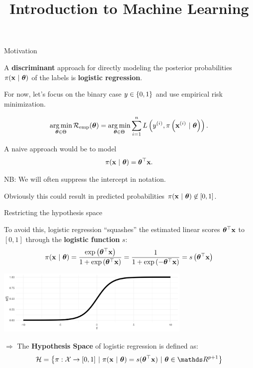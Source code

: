 \documentclass[11pt,compress,t,notes=noshow, xcolor=table]{beamer}
\title{Introduction to Machine Learning}
\begin{document}

\framebreak


\begin{vbframe}{Motivation}

A \textbf{discriminant} approach for directly modeling the posterior probabilities $\pi(\mathbf{x}~|~ \bm{\theta})$ of the labels is \textbf{logistic regression}. 

For now, let's focus on the binary case $y \in \{0, 1\}$ and use empirical risk minimization.
  
$$ \operatorname*{arg\,min}_{\bm{\theta} \in \Theta} \mathcal{R}_{\text{emp}}(\bm{\theta}) = \operatorname*{arg\,min}_{\bm{\theta} \in \Theta} \sum\limits_{i=1}^n L\left(y^{(i)}, \pi\left(\mathbf{x}^{(i)} ~|~ \bm{\theta}\right)\right).$$

\lz
A naive approach would be to model
\[
\pi(\mathbf{x}~|~ \bm{\theta}) = \bm{\theta}^\top \mathbf{x} .
\]

NB: We will often suppress the intercept in notation.

\lz

Obviously this could result in predicted probabilities $\pi(\mathbf{x}~|~ \bm{\theta}) \not\in [0,1]$.

\end{vbframe}

\begin{vbframe}{Restricting the hypothesis space}

To avoid this, logistic regression \enquote{squashes} the estimated linear scores $\bm{\theta}^\top \mathbf{x}$ to $[0,1]$ through the \textbf{logistic function} $s$:
\[
\pi(\mathbf{x}~|~ \bm{\theta}) = \frac{\exp\left( \bm{\theta}^\top \mathbf{x} \right)}{1+\exp\left(\bm{\theta}^\top \mathbf{x} \right)} = \frac{1}{1+\exp\left( -\bm{\theta}^\top \mathbf{x} \right)} = s\left( \bm{\theta}^\top \mathbf{x} \right)
\]

\begin{center}
  \includegraphics[width=0.70\textwidth]{figure/logistic_function.png} 
\end{center}

$\Rightarrow$ The \textbf{Hypothesis Space} of logistic regression is defined as:
\begin{eqnarray*}
  \Hspace = \left\{\pi: \Xspace \to [0,1] ~|~\pixt = s(\thx) ~|~ \thetav \in \R^{p+1} \right\}
\end{eqnarray*}

\end{vbframe}
\end{document}
